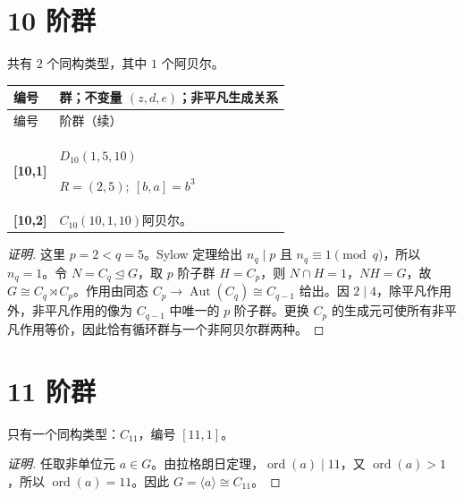 \documentclass[UTF8,fontset=fandol,11pt,a4paper]{ctexart}
\newcommand{\Aut}{\operatorname{Aut}}\newcommand{\GL}{\operatorname{GL}}\newcommand{\ord}{\operatorname{ord}}\newcommand{\Z}{\mathrm Z}
\begin{document}
\section*{10 阶群}\label{order:10}

共有 $2$ 个同构类型，其中 $1$ 个阿贝尔。

\begingroup\small\setlength{\tabcolsep}{3pt}\renewcommand{\arraystretch}{1.12}

\begin{longtable}{@{}p{17mm}>{\raggedright\arraybackslash}p{141mm}@{}}

\toprule 编号 & 群；不变量 $(z,d,e)$；非平凡生成关系\\\midrule\endfirsthead

\toprule 编号 & 10 阶群（续）\\\midrule\endhead\bottomrule\endfoot

\textbf{[10,1]} & $D_{10}$\quad $(1,5,10)$\par\(R=(2,5);\allowbreak\ [b,a]=b^{3}\)\\[3pt]

\textbf{[10,2]} & $C_{10}$\quad $(10,1,10)$\quad 阿贝尔。\\[3pt]

\end{longtable}\endgroup

\begin{proof}[证明]
这里 $p=2<q=5$。Sylow 定理给出 $n_q\mid p$ 且 $n_q\equiv1\pmod q$，所以 $n_q=1$。令 $N=C_q\trianglelefteq G$，取 $p$ 阶子群 $H=C_p$，则 $N\cap H=1$，$NH=G$，故 $G\cong C_q\rtimes C_p$。作用由同态 $C_p\to\Aut(C_q)\cong C_{q-1}$ 给出。因 $2\mid 4$，除平凡作用外，非平凡作用的像为 $C_{q-1}$ 中唯一的 $p$ 阶子群。更换 $C_p$ 的生成元可使所有非平凡作用等价，因此恰有循环群与一个非阿贝尔群两种。
\end{proof}

\section*{11 阶群}\label{order:11}

只有一个同构类型：$C_{11}$，编号 $[11,1]$。

\begin{proof}[证明]
任取非单位元 $a\in G$。由拉格朗日定理，$\ord(a)\mid 11$，又 $\ord(a)>1$，所以 $\ord(a)=11$。因此 $G=\langle a\rangle\cong C_{11}$。
\end{proof}
\end{document}
